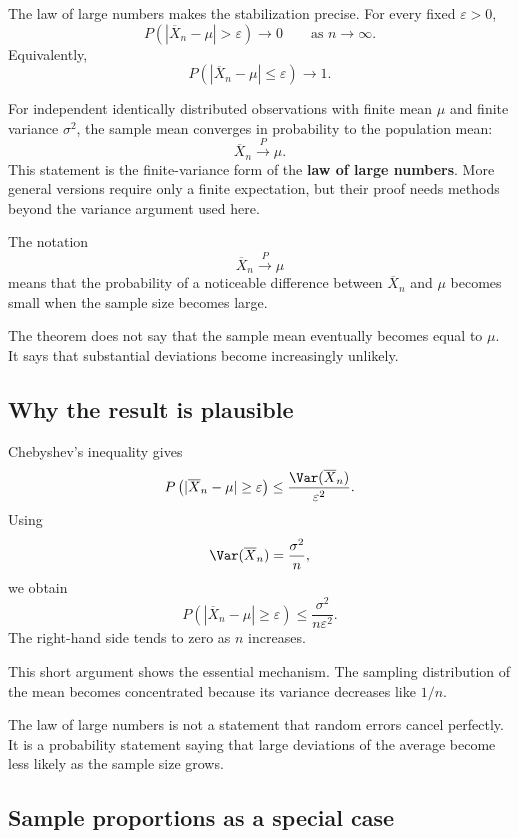 The law of large numbers makes the stabilization precise. For every fixed
\(\varepsilon>0\),
\[
P\left(|\overline X_n-\mu|>\varepsilon\right)
\longrightarrow 0
\qquad\text{as }n\to\infty.
\]
Equivalently,
\[
P\left(|\overline X_n-\mu|\leq\varepsilon\right)
\longrightarrow 1.
\]

\begin{theorembox}
For independent identically distributed observations with finite mean \(\mu\) and
finite variance \(\sigma^2\), the sample mean converges in probability to the
population mean:
\[
\overline X_n\xrightarrow{P}\mu.
\]
This statement is the finite-variance form of the \textbf{law of large numbers}.
More general versions require only a finite expectation, but their proof needs
methods beyond the variance argument used here.
\end{theorembox}

The notation
\[
\overline X_n\xrightarrow{P}\mu
\]
means that the probability of a noticeable difference between \(\overline X_n\)
and \(\mu\) becomes small when the sample size becomes large.

The theorem does not say that the sample mean eventually becomes equal to
\(\mu\). It says that substantial deviations become increasingly unlikely.

\subsection*{Why the result is plausible}

Chebyshev's inequality gives
\[
P\left(|\overline X_n-\mu|\geq\varepsilon\right)
\leq
\frac{\Var(\overline X_n)}{\varepsilon^2}.
\]
Using
\[
\Var(\overline X_n)=\frac{\sigma^2}{n},
\]
we obtain
\[
P\left(|\overline X_n-\mu|\geq\varepsilon\right)
\leq
\frac{\sigma^2}{n\varepsilon^2}.
\]
The right-hand side tends to zero as \(n\) increases.

This short argument shows the essential mechanism. The sampling distribution of
the mean becomes concentrated because its variance decreases like \(1/n\).

\begin{remarkbox}
The law of large numbers is not a statement that random errors cancel perfectly.
It is a probability statement saying that large deviations of the average become
less likely as the sample size grows.
\end{remarkbox}

\subsection*{Sample proportions as a special case}

